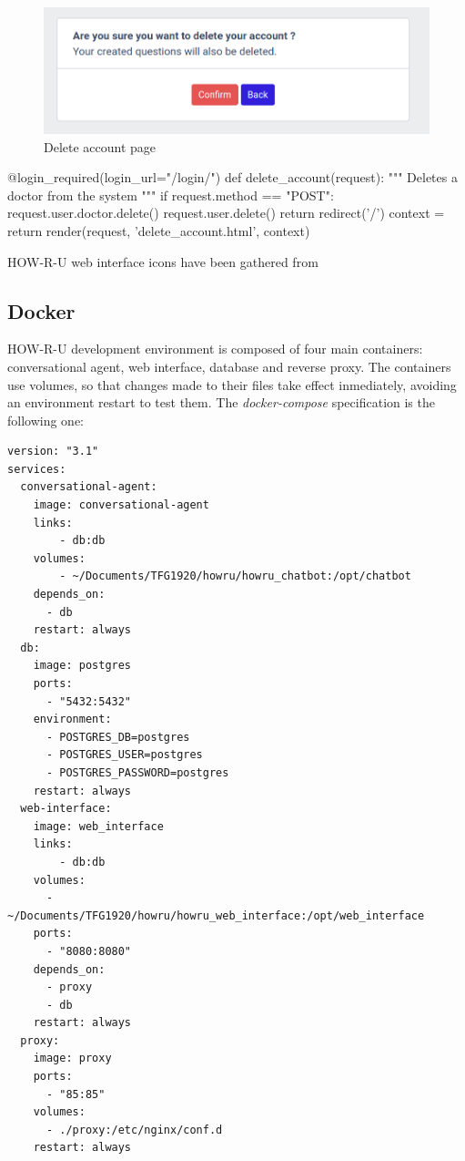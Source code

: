 \documentclass[12pt,english]{article}
\begin{document}
\begin{figure}[H]
    \centering
    \includegraphics[width=\textwidth]{delete_account.png}
    \caption{Delete account page}
\end{figure}


\begin{python}[caption={Method to delete an account}, captionpos=b]
@login_required(login_url="/login/")
def delete_account(request):
    """
    Deletes a doctor from the system
    """
    if request.method == "POST":
        request.user.doctor.delete()
        request.user.delete()
        return redirect('/')
    context = {}
    return render(request, 'delete_account.html', context)
\end{python}

HOW-R-U web interface icons have been gathered from \cite{pixabay}
\newpage
\subsection{Docker}
\label{sec:docker}

HOW-R-U development environment is composed of four main containers: conversational agent, web interface, database and reverse proxy. The containers use volumes, so that changes made to their files take effect inmediately, avoiding an environment restart to test them. The \emph{docker-compose} specification is the following one:

\begin{lstlisting}[language=docker-compose-2, caption={HOW-R-U docker-compose file}, captionpos=b]
version: "3.1"
services:
  conversational-agent:
    image: conversational-agent
    links:
        - db:db
    volumes:
        - ~/Documents/TFG1920/howru/howru_chatbot:/opt/chatbot
    depends_on:
      - db
    restart: always
  db:
    image: postgres
    ports:
      - "5432:5432"
    environment:
      - POSTGRES_DB=postgres
      - POSTGRES_USER=postgres
      - POSTGRES_PASSWORD=postgres
    restart: always
  web-interface:
    image: web_interface
    links:
        - db:db
    volumes:
      - ~/Documents/TFG1920/howru/howru_web_interface:/opt/web_interface
    ports:
      - "8080:8080"
    depends_on:
      - proxy
      - db
    restart: always
  proxy:
    image: proxy
    ports:
      - "85:85"
    volumes:
      - ./proxy:/etc/nginx/conf.d
    restart: always
\end{lstlisting}
\end{document}
